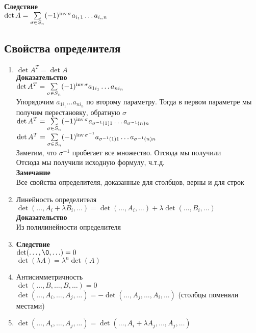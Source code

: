 \documentclass[12pt]{article}
\begin{document}
\textbf{Следствие}\\
$\det A = \sum\limits_{\sigma \in S_n} (-1)^{\operatorname{inv}\sigma}a_{i_11}\ldots a_{i_nn}$\\
\subsection{Свойства определителя}
\begin{enumerate}
    \item $\det A^T = \det A$\\
    \textbf{Доказательство}\\
    $\det A^T = \sum\limits_{\sigma \in S_n} (-1)^{\operatorname{inv}\sigma}a_{1i_1}\ldots a_{ni_n}$\\
    Упорядочим $a_{1i_1}\ldots a_{ni_n}$ по второму параметру. Тогда в первом параметре мы получим перестановку, обратную $\sigma$\\
    $\det A^T = \sum\limits_{\sigma \in S_n} (-1)^{\operatorname{inv}\sigma}a_{\sigma^{-1}(1)1}\ldots a_{\sigma^{-1}(n)n}$\\
    $\det A^T = \sum\limits_{\sigma \in S_n} (-1)^{\operatorname{inv}\sigma^{-1}}a_{\sigma^{-1}(1)1}\ldots a_{\sigma^{-1}(n)n}$\\
    Заметим, что $\sigma^{-1}$ пробегает все множество. Отсюда мы получили\\
    Отсюда мы получили исходную формулу, ч.т.д.\\
    \textbf{Замечание}\\
    Все свойства определителя, доказанные для столбцов, верны и для строк
    \item Линейность определителя\\
    $\det(\ldots, A_i+\lambda B_i, \ldots) = \det(\ldots, A_i, \ldots) + \lambda \det(\ldots, B_i, \ldots)$\\
    \textbf{Доказательство}\\
    Из полилинейности определителя\\
    \item \textbf{Следствие}\\
    $\det(\ldots, \0, \ldots) = 0$\\
    $\det(\lambda A) = \lambda^n \det(A)$
    \item Антисимметричность\\
    $\det (\ldots, B, \ldots, B, \ldots) = 0$\\
    $\det (\ldots, A_i, \ldots, A_j, \ldots) = -\det (\ldots, A_j, \ldots, A_i, \ldots)$ (столбцы поменяли местами)
    \item $\det(\ldots, A_i, \ldots, A_j, \ldots) = \det (\ldots, A_i+\lambda A_j, \ldots, A_j, \ldots)$

\end{enumerate}
\end{document}
